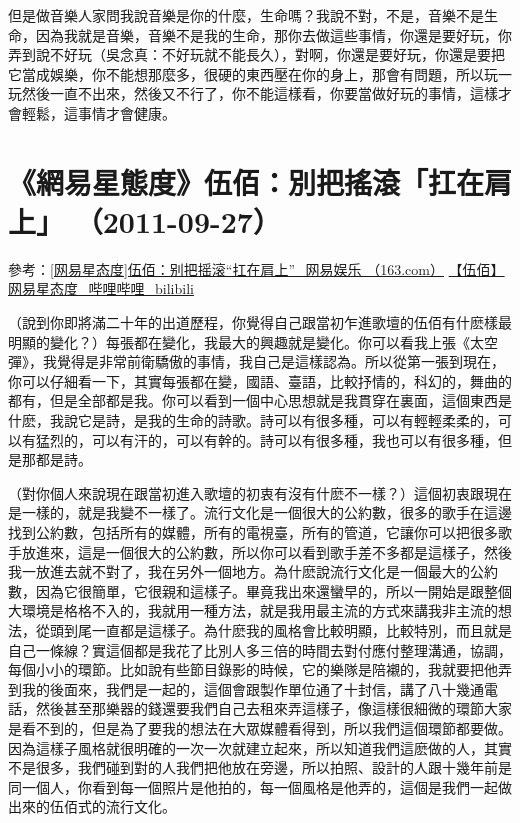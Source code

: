 \documentclass[UTF8,a4paper,oneside,twocolumn,12pt]{ctexbook}
\begin{document}
但是做音樂人家問我說音樂是你的什麼，生命嗎？我說不對，不是，音樂不是生命，因為我就是音樂，音樂不是我的生命，那你去做這些事情，你還是要好玩，你弄到說不好玩（吳念真：不好玩就不能長久），對啊，你還是要好玩，你還是要把它當成娛樂，你不能想那麼多，很硬的東西壓在你的身上，那會有問題，所以玩一玩然後一直不出來，然後又不行了，你不能這樣看，你要當做好玩的事情，這樣才會輕鬆，這事情才會健康。

\section{《網易星態度》伍佰：別把搖滾「扛在肩上」 （2011-09-27）}
參考：\href{https://www.163.com/ent/article/7F07EFOK00034NKD.html}{[网易星态度]伍佰：别把摇滚“扛在肩上”\_网易娱乐 （163.com）}
\href{https://www.bilibili.com/video/BV1C7411E7vm}{【伍佰】网易星态度\_哔哩哔哩\_bilibili}

（說到你即將滿二十年的出道歷程，你覺得自己跟當初乍進歌壇的伍佰有什麽樣最明顯的變化？）每張都在變化，我最大的興趣就是變化。你可以看我上張《太空彈》，我覺得是非常前衛驕傲的事情，我自己是這樣認為。所以從第一張到現在，你可以仔細看一下，其實每張都在變，國語、臺語，比較抒情的，科幻的，舞曲的都有，但是全部都是我。你可以看到一個中心思想就是我貫穿在裏面，這個東西是什麽，我說它是詩，是我的生命的詩歌。詩可以有很多種，可以有輕輕柔柔的，可以有猛烈的，可以有汗的，可以有幹的。詩可以有很多種，我也可以有很多種，但是那都是詩。

（對你個人來說現在跟當初進入歌壇的初衷有沒有什麽不一樣？）這個初衷跟現在是一樣的，就是我變不一樣了。流行文化是一個很大的公約數，很多的歌手在這邊找到公約數，包括所有的媒體，所有的電視臺，所有的管道，它讓你可以把很多歌手放進來，這是一個很大的公約數，所以你可以看到歌手差不多都是這樣子，然後我一放進去就不對了，我在另外一個地方。為什麽說流行文化是一個最大的公約數，因為它很簡單，它很親和這樣子。畢竟我出來還蠻早的，所以一開始是跟整個大環境是格格不入的，我就用一種方法，就是我用最主流的方式來講我非主流的想法，從頭到尾一直都是這樣子。為什麽我的風格會比較明顯，比較特別，而且就是自己一條線？實這個都是我花了比別人多三倍的時間去對付應付整理溝通，協調，每個小小的環節。比如說有些節目錄影的時候，它的樂隊是陪襯的，我就要把他弄到我的後面來，我們是一起的，這個會跟製作單位通了十封信，講了八十幾通電話，然後甚至那樂器的錢還要我們自己去租來弄這樣子，像這樣很細微的環節大家是看不到的，但是為了要我的想法在大眾媒體看得到，所以我們這個環節都要做。因為這樣子風格就很明確的一次一次就建立起來，所以知道我們這麽做的人，其實不是很多，我們碰到對的人我們把他放在旁邊，所以拍照、設計的人跟十幾年前是同一個人，你看到每一個照片是他拍的，每一個風格是他弄的，這個是我們一起做出來的伍佰式的流行文化。
\end{document}

